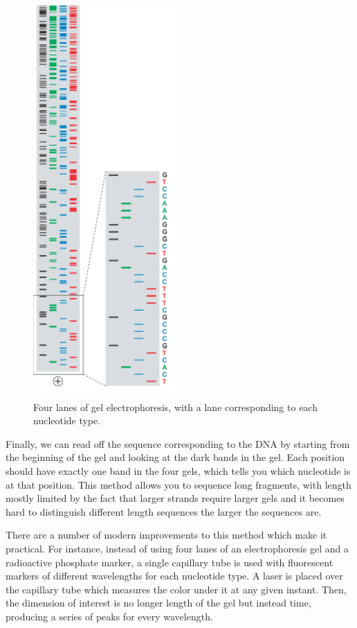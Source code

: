 \documentclass{article}
\begin{document}
\begin{figure}[h!]
    \centering
    \includegraphics[scale=0.5,angle=-90]{images/lanes.png}
    \caption{
        Four lanes of gel electrophoresis, with a lane corresponding to each nucleotide type.
   }
\end{figure}

Finally, we can read off the sequence corresponding to the DNA by starting from the beginning of the
gel and looking at the dark bands in the gel. Each position should have exactly one band in the four
gels, which tells you which nucleotide is at that position. This method allows you to sequence long
fragments, with length mostly limited by the fact that larger strands require larger gels and it
becomes hard to distinguish different length sequences the larger the sequences are. 

There are a number of modern improvements to this method which make it practical. For instance,
instead of using four lanes of an electrophoresis gel and a radioactive phosphate marker, a single
capillary tube is used with fluorescent markers of different wavelengths for each nucleotide type. A
laser is placed over the capillary tube which measures the color under it at any given instant.
Then, the dimension of interest is no longer length of the gel but instead time, producing a series
of peaks for every wavelength.
\end{document}
